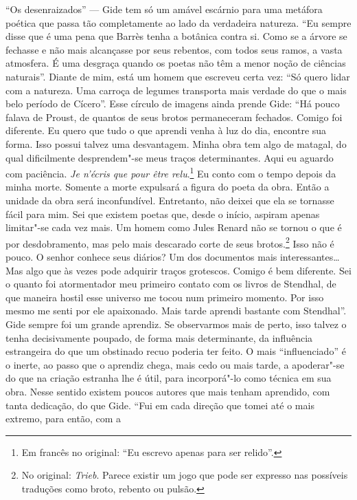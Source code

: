 ``Os desenraizados'' --- Gide tem só um amável escárnio para uma metáfora
poética que passa tão completamente ao lado da verdadeira natureza. ``Eu
sempre disse que é uma pena que Barrès tenha a botânica contra si. Como
se a árvore se fechasse e não mais alcançasse por seus rebentos, com
todos seus ramos, a vasta atmosfera. É uma desgraça quando os poetas não
têm a menor noção de ciências naturais''. Diante de mim, está um homem
que escreveu certa vez: ``Só quero lidar com a natureza. Uma carroça
de legumes transporta mais verdade do que o mais belo período de
Cícero''. Esse círculo de imagens ainda prende Gide: ``Há pouco falava
de Proust, de quantos de seus brotos permaneceram fechados. Comigo foi
diferente. Eu quero que tudo o que aprendi venha à luz do dia, encontre
sua forma. Isso possui talvez uma desvantagem. Minha obra tem algo de
matagal, do qual dificilmente desprendem"-se meus traços determinantes.
Aqui eu aguardo com paciência. \emph{Je n'écris que pour être
relu}.\footnote{Em francês no original: ``Eu escrevo apenas para
  ser relido''. \versal{[N. T.]}} Eu conto com o tempo depois da minha morte. Somente
a morte expulsará a figura do poeta da obra. Então a unidade da obra
será inconfundível. Entretanto, não deixei que ela se tornasse fácil
para mim. Sei que existem poetas que, desde o início, aspiram apenas
limitar"-se cada vez mais. Um homem como Jules Renard não se tornou o que
é por desdobramento, mas pelo mais descarado corte de seus
brotos.\footnote{No original: \emph{Trieb}. Parece existir um jogo
  que pode ser expresso nas possíveis traduções como broto, rebento ou
  pulsão. \versal{[N. T.]}} Isso não é pouco. O senhor conhece seus diários? Um dos
documentos mais interessantes\ldots{} Mas algo que às vezes pode adquirir
traços grotescos. Comigo é bem diferente. Sei o quanto foi
atormentador meu primeiro contato com os livros de Stendhal, de que maneira
hostil esse universo me tocou num primeiro momento. Por isso mesmo me
senti por ele apaixonado. Mais tarde aprendi bastante com Stendhal''.
Gide sempre foi um grande aprendiz. Se observarmos mais de perto, isso
talvez o tenha decisivamente poupado, de forma mais determinante, da
influência estrangeira do que um obstinado recuo poderia ter feito. O
mais ``influenciado'' é o inerte, ao passo que o aprendiz chega, mais
cedo ou mais tarde, a apoderar"-se do que na criação estranha lhe é útil,
para incorporá"-lo como técnica em sua obra. Nesse sentido existem poucos
autores que mais tenham aprendido, com tanta dedicação, do que Gide.
``Fui em cada direção que tomei até o mais extremo, para então, com a
